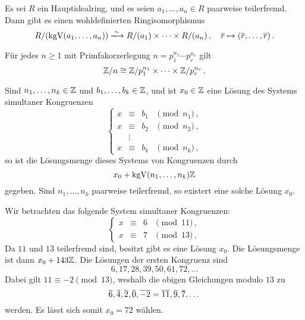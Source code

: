 \begin{corollary}
  Es sei $R$ ein Hauptidealring, und es seien $a_1, \dotsc, a_n \in R$ paarweise teilerfremd.
  Dann gibt es einen wohldefinierten Ringisomorphismus
  \[
                            R/\genideal{\kgV(a_1, \dotsc, a_n)}
    \xlongrightarrow{\sim}  R/\genideal{a_1} \times \dotsb \times R/\genideal{a_n} \,,
    \quad                   \class{r}
    \mapsto                 ( \class{r}, \dotsc, \class{r} ) \,.
  \]
\end{corollary}

\begin{corollary}
  Für jedes $n \geq 1$ mit Primfakorzerlegung $n = p_1^{n_1} \dotsm p_r^{n_r}$ gilt
  \[
          \mathbb{Z}/n
    \cong \mathbb{Z}/p_1^{n_1} \times \dotsb \times \mathbb{Z}/p_r^{n_r} \,.
  \]
\end{corollary}

\begin{corollary}
  Sind $n_1, \dotsc, n_k \in \mathbb{Z}$ und $b_1, \dotsc, b_k \in \mathbb{Z}$, und ist $x_0 \in \mathbb{Z}$ eine Lösung des Systems simultaner Kongruenzen
  \[
    \left\{
      \begin{array}{ccll}
        x &\equiv& b_1  & \pmod{n_1}  \,, \\
        x &\equiv& b_2  & \pmod{n_2}  \,, \\
          &\vdots&      &                 \\
        x &\equiv& b_k  & \pmod{n_k}  \,,
      \end{array}
    \right.
  \]
  so ist die Lösungsmenge dieses Systems von Kongruenzen durch
  \[
      x_0
    + \operatorname{kgV}(n_1, \dotsc, n_k) \mathbb{Z}
  \]
  gegeben.
  Sind $n_1, \dotsc, n_k$ paarweise teilerfremd, so existert eine solche Lösung $x_0$.
\end{corollary}

\begin{example}
  Wir betrachten das folgende System simultaner Kongruenzen:
  \[
    \left\{
      \begin{array}{ccll}
        x &\equiv& 6  & \pmod{11} \,, \\
        x &\equiv& 7  & \pmod{13} \,,
      \end{array}
    \right.
  \]
  Da $11$ und $13$ teilerfremd sind, besitzt gibt es eine Lösung $x_0$.
  Die Lösungsmenge ist dann $x_0 + 143\mathbb{Z}$.
  Die Lösungen der ersten Kongruenz sind
  \[
    6,
    17,
    28,
    39,
    50,
    61,
    72,
    \dotsc
  \]
  Dabei gilt $11 \equiv -2 \pmod{13}$, weshalb die obigen Gleichungen modulo $13$ zu
  \[
    \overline{6},
    \overline{4},
    \overline{2},
    \overline{0},
    \overline{-2} = \overline{11},
    \overline{9},
    \overline{7},
    \dotsc
  \]
  werden.
  Es lässt sich somit $x_0 = 72$ wählen.
\end{example}


